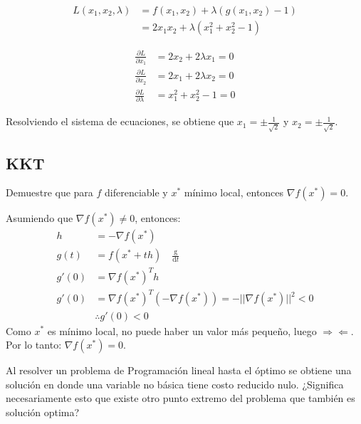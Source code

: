\documentclass{article}
\newenvironment{question}
{\begin{mdframed}[backgroundcolor=white]}
{\end{mdframed}}
\newenvironment{solution}
{\begin{mdframed}[backgroundcolor=lightorange,hidealllines=true]}
{\end{mdframed}}
\begin{document}
\begin{solution}
    \begin{align*}
        L(x_1,x_2,\lambda) &= f(x_1,x_2) + \lambda(g(x_1,x_2)-1)\\
        &= 2x_1x_2 + \lambda(x_1^2+x_2^2-1)
    \end{align*}

    \begin{align*}
        \frac{\partial L}{\partial x_1} &= 2x_2 + 2\lambda x_1 = 0\\
        \frac{\partial L}{\partial x_2} &= 2x_1 + 2\lambda x_2 = 0\\
        \frac{\partial L}{\partial \lambda} &= x_1^2 + x_2^2 - 1 = 0
    \end{align*}

    Resolviendo el sistema de ecuaciones, se obtiene que $x_1 = \pm \frac{1}{\sqrt{2}}$ y $x_2 = \pm \frac{1}{\sqrt{2}}$.
\end{solution}

\subsection{KKT} \label{problemas:kkt}
\begin{question}
    Demuestre que para $f$ diferenciable y $x^*$ mínimo local, entonces $\nabla f(x^*)=0$.
\end{question}

\begin{solution}
    Asumiendo que $\nabla f(x^*)\neq 0$, entonces:
    \begin{align*}
        h&=-\nabla f(x^*)\\
        g(t)&=f(x^* + th) \quad \frac{\mathrm{g}}{\mathrm{d}t}\\
        g'(0)&=\nabla f(x^*)^T h\\
        g'(0)&=\nabla f(x^*)^T (-\nabla f(x^*))= -||\nabla f(x^*)||^2 < 0\\
        &\therefore g'(0) < 0
    \end{align*}
    Como $x^*$ es mínimo local, no puede haber un valor más pequeño, luego $\Rightarrow \! \Leftarrow$. Por lo tanto: $\nabla f(x^*)=0$.
\end{solution}

\begin{question}
    Al resolver un problema de Programación lineal hasta el óptimo se obtiene una solución en donde una variable no básica tiene costo reducido nulo. ¿Significa necesariamente esto que existe otro punto extremo del problema que también es solución optima?
\end{question}
\end{document}
